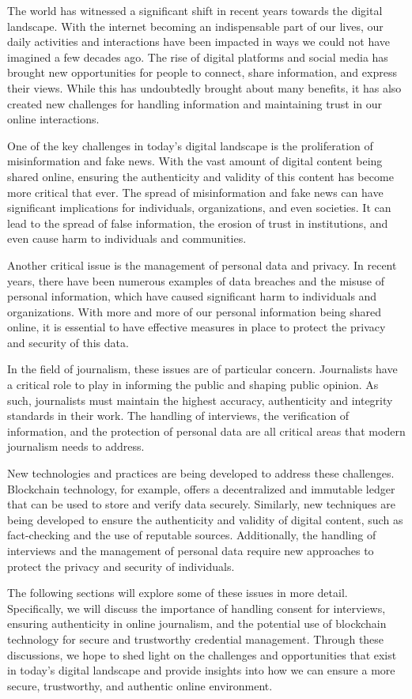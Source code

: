 \documentclass[target=mst,aauheader=]{thud}
\begin{document}
The world has witnessed a significant shift in recent years towards the digital landscape. With the internet becoming an indispensable part of our lives, our daily activities and interactions have been impacted in ways we could not have imagined a few decades ago. The rise of digital platforms and social media has brought new opportunities for people to connect, share information, and express their views. While this has undoubtedly brought about many benefits, it has also created new challenges for handling information and maintaining trust in our online interactions.\par
One of the key challenges in today's digital landscape is the proliferation of misinformation and fake news. With the vast amount of digital content being shared online, ensuring the authenticity and validity of this content has become more critical that ever. The spread of misinformation and fake news can have significant implications for individuals, organizations, and even societies. It can lead to the spread of false information, the erosion of trust in institutions, and even cause harm to individuals and communities.\par
Another critical issue is the management of personal data and privacy. In recent years, there have been numerous examples of data breaches and the misuse of personal information, which have caused significant harm to individuals and organizations. With more and more of our personal information being shared online, it is essential to have effective measures in place to protect the privacy and security of this data.\par
In the field of journalism, these issues are of particular concern. Journalists have a critical role to play in informing the public and shaping public opinion. As such, journalists must maintain the highest accuracy, authenticity and integrity standards in their work. The handling of interviews, the verification of information, and the protection of personal data are all critical areas that modern journalism needs to address.\par
New technologies and practices are being developed to address these challenges. Blockchain technology, for example, offers a decentralized and immutable ledger that can be used to store and verify data securely. Similarly, new techniques are being developed to ensure the authenticity and validity of digital content, such as fact-checking and the use of reputable sources. Additionally, the handling of interviews and the management of personal data require new approaches to protect the privacy and security of individuals.\par
The following sections will explore some of these issues in more detail. Specifically, we will discuss the importance of handling consent for interviews, ensuring authenticity in online journalism, and the potential use of blockchain technology for secure and trustworthy credential management. Through these discussions, we hope to shed light on the challenges and opportunities that exist in today's digital landscape and provide insights into how we can ensure a more secure, trustworthy, and authentic online environment.
\end{document}
